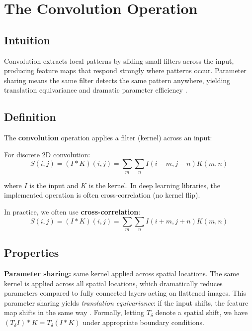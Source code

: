 
\section{The Convolution Operation}
\label{sec:convolution}


\subsection*{Intuition}
Convolution extracts local patterns by sliding small filters across the input, producing feature maps that respond strongly where patterns occur. Parameter sharing means the same filter detects the same pattern anywhere, yielding translation equivariance  and dramatic parameter efficiency \cite{GoodfellowEtAl2016,Prince2023}.

\subsection{Definition}

The \textbf{convolution} operation applies a filter (kernel) across an input:

For discrete 2D convolution:
\begin{equation}
S(i,j) = (I * K)(i,j) = \sum_m \sum_n I(i-m, j-n) K(m, n)
\end{equation}

where $I$ is the input and $K$ is the kernel. In deep learning libraries, the implemented operation is often cross-correlation (no kernel flip).

In practice, we often use \textbf{cross-correlation}:
\begin{equation}
S(i,j) = (I * K)(i,j) = \sum_m \sum_n I(i+m, j+n) K(m, n)
\end{equation}

\subsection{Properties}

\textbf{Parameter sharing:} same kernel applied across spatial locations. The same kernel is applied across all spatial locations, which dramatically reduces parameters compared to fully connected layers acting on flattened images. This parameter sharing yields \emph{translation equivariance}: if the input shifts, the feature map shifts in the same way \cite{GoodfellowEtAl2016,Prince2023}. Formally, letting \(T_\delta\) denote a spatial shift, we have \((T_\delta I) * K = T_\delta (I * K)\) under appropriate boundary conditions.


